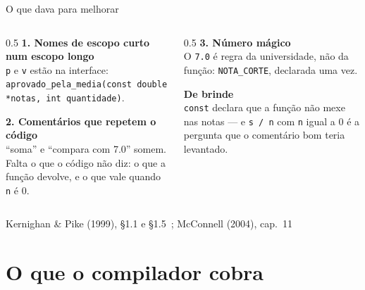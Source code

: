 \documentclass[aspectratio=169]{beamer}
\newcommand{\fonte}[1]{\vfill\hfill{\scriptsize\textcolor{UFSGray}{#1}}}
\begin{document}
\begin{frame}{O que dava para melhorar}
  \begin{columns}[T]
    \begin{column}{0.5\textwidth}
      \small
      \textbf{1. Nomes de escopo curto num escopo longo}\\
      \texttt{p} e \texttt{v} estão na interface:
      \texttt{aprovado\_pela\_media(const double *notas, int quantidade)}.

      \medskip
      \textbf{2. Comentários que repetem o código}\\
      ``soma'' e ``compara com 7.0'' somem. Falta o que o código não diz: o
      que a função devolve, e o que vale quando \texttt{n} é 0.
    \end{column}
    \begin{column}{0.5\textwidth}
      \small
      \textbf{3. Número mágico}\\
      O \texttt{7.0} é regra da universidade, não da função:
      \texttt{NOTA\_CORTE}, declarada uma vez.

      \medskip
      \textbf{De brinde}\\
      \texttt{const} declara que a função não mexe nas notas --- e
      \texttt{s / n} com \texttt{n} igual a 0 é a pergunta que o comentário
      bom teria levantado.
    \end{column}
  \end{columns}
  \fonte{Kernighan \& Pike (1999), §1.1 e §1.5~\cite{kernighan1999practice}; McConnell (2004), cap.~11~\cite{mcconnell2004code}}
\end{frame}

\section{O que o compilador cobra}
\end{document}
